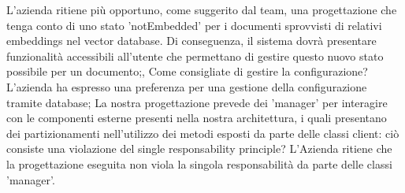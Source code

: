 {{L'azienda ritiene più opportuno, come suggerito dal team, una progettazione che tenga conto di uno stato 'notEmbedded' per i documenti sprovvisti di relativi embeddings nel vector database. Di conseguenza, il sistema dovrà presentare funzionalità accessibili all'utente che permettano di gestire questo nuovo stato possibile per un documento;},
\domris
{Come consigliate di gestire la configurazione?}
{L'azienda ha espresso una preferenza per una gestione della configurazione tramite database;}
\domris
{La nostra progettazione prevede dei 'manager' per interagire con le componenti esterne presenti nella nostra architettura, i quali presentano dei partizionamenti nell'utilizzo dei metodi esposti da parte delle classi client: ciò consiste una violazione del single responsability principle?}
{L'Azienda ritiene che la progettazione eseguita non viola la singola responsabilità da parte delle classi 'manager'.}
} 




\def\listaDecisioni {
{Il cambiamento del modello per la generazione degli embeddings e il vector database attivo nel sistema è preferibile che siano scelti solo in fase di avvio;},
{I documenti possono presentare uno stato 'notEmbedded' e il sistema deve offrire all'utente le funzionalità necessarie al ripristino di un corretto stato del sistema;},
{I 'manager' progettati dal team non violano il single responsability principle.}
}